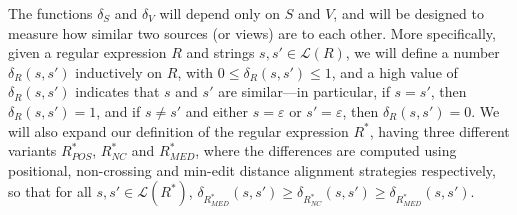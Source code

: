 \documentclass[acmsmall,review,anonymous]{acmart}\settopmatter{printfolios=true,printccs=false,printacmref=false}
\theoremstyle{definition}
\begin{document}
The functions $\delta_S$ and $\delta_V$ will depend only on $S$ and $V$, and will be designed to measure how similar two sources (or views) are to each other. More specifically, given a regular expression $R$ and strings $s, s' \in \mathcal{L}(R)$, we will define a number $\delta_R(s, s')$ inductively on $R$, with $0 \leq \delta_R(s, s') \leq 1$, and a high value of $\delta_R(s, s')$ indicates that $s$ and $s'$ are similar---in particular, if $s = s'$, then $\delta_R(s, s') = 1$, and if $s \neq s'$ and either $s = \varepsilon$ or $s' = \varepsilon$, then $\delta_R(s, s') = 0$. We will also expand our definition of the regular expression $R^*$, having three different variants $R^*_{POS}$, $R^*_{NC}$ and $R^*_{MED}$, where the differences are computed using positional, non-crossing and min-edit distance alignment strategies respectively, so that for all $s, s' \in \mathcal{L}(R^*)$, $\delta_{R^*_{MED}}(s, s') \geq \delta_{R^*_{NC}}(s, s') \geq \delta_{R^*_{MED}}(s, s')$.
\end{document}
